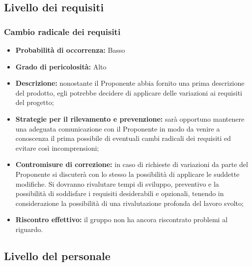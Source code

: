 \subsection{Livello dei requisiti}

\subsubsection{Cambio radicale dei requisiti}
\hypertarget{subsubsect:requisiti}{}
\begin{itemize}
\item \textbf{Probabilità di occorrenza:} Basso
\item \textbf{Grado di pericolosità:} Alto

\item \textbf{Descrizione:} nonostante il Proponente abbia fornito una prima descrizione del prodotto, egli potrebbe decidere di applicare delle variazioni ai requisiti del progetto;

\item \textbf{Strategie per il rilevamento e prevenzione:} sarà opportuno mantenere una adeguata comunicazione con il Proponente in modo da venire a conoscenza il prima possibile di eventuali cambi radicali dei requisiti ed evitare così incomprensioni;

\item \textbf{Contromisure di correzione:} in caso di richieste di variazioni da parte del Proponente si discuterà con lo stesso la possibilità di applicare le suddette modifiche. Si dovranno rivalutare tempi di sviluppo, preventivo e la possibilità di soddisfare i requisiti desiderabili e opzionali, tenendo in considerazione la possibilità di una rivalutazione profonda del lavoro svolto;

\item \textbf{Riscontro effettivo:} il gruppo non ha ancora riscontrato problemi al riguardo.
\end{itemize}

\subsection{Livello del personale}

